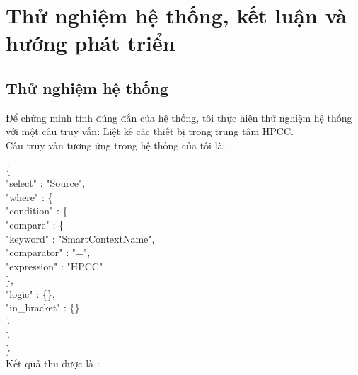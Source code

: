 \chapter{Thử nghiệm hệ thống, kết luận và hướng phát triển}
\section{Thử nghiệm hệ thống}
Để chứng minh tính đúng đắn của hệ thống, tôi thực hiện thử nghiệm hệ thống với một câu truy vấn: Liệt kê các thiết bị trong trung tâm HPCC. \\

Câu truy vấn tương ứng trong hệ thống của tôi là:


\{\\
\blank{1cm}"select" : "Source",\\
\blank{1cm}"where" : \{\\
\blank{2cm}"condition" : \{\\
\blank{3cm}"compare" : \{\\
\blank{4cm}    "keyword" : "SmartContextName",\\
\blank{4cm}    "comparator" : "=",\\
\blank{4cm}    "expression" : "HPCC"\\
\blank{3cm}\},\\
\blank{3cm}"logic" : \{\},\\
\blank{3cm}"in\_bracket" : \{\}\\
\blank{2cm}\}\\
\blank{1cm}\}\\
\}\\

Kết quả thu được là :\\

